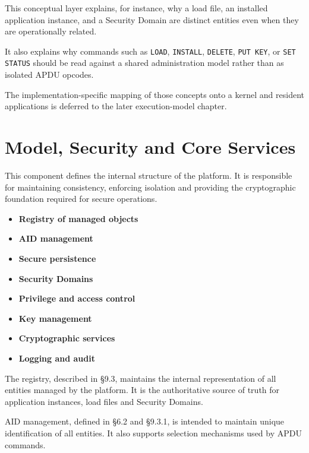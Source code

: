 This conceptual layer explains, for instance, why a load file, an
installed application instance, and a Security Domain are distinct
entities even when they are operationally related.

It also explains why commands such as \texttt{LOAD}, \texttt{INSTALL},
\texttt{DELETE}, \texttt{PUT KEY}, or \texttt{SET STATUS} should be read
against a shared administration model rather than as isolated APDU
opcodes.

The implementation-specific mapping of those concepts onto a kernel and
resident applications is deferred to the later execution-model chapter.

\section{Model, Security and Core Services}

This component defines the internal structure of the platform. It is
responsible for maintaining consistency, enforcing isolation and providing the
cryptographic foundation required for secure operations.

\begin{itemize}
\item \textbf{Registry of managed objects} 
\item \textbf{AID management} 
\item \textbf{Secure persistence} 
\item \textbf{Security Domains} 
\item \textbf{Privilege and access control} 
\item \textbf{Key management} 
\item \textbf{Cryptographic services} 
\item \textbf{Logging and audit} 
\end{itemize}

The registry, described in §9.3, maintains the internal representation of all
entities managed by the platform. It is the authoritative source of truth for
application instances, load files and Security Domains.

AID management, defined in §6.2 and §9.3.1, is intended to maintain unique
identification of all entities. It also supports selection mechanisms used by
APDU commands.

